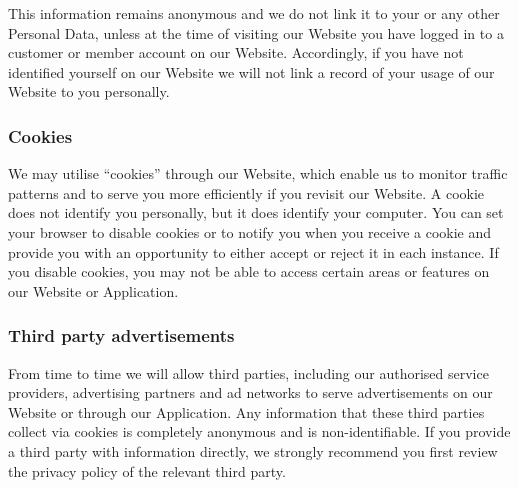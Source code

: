 \documentclass[10pt]{article}
\begin{document}
This information remains anonymous and we do not link it to your or any other Personal Data, unless at the time of visiting our Website you have logged in to a customer or member account on our Website. Accordingly, if you have not identified yourself on our Website we will not link a record of your usage of our Website to you personally.

\subsubsection{Cookies}
We may utilise ``cookies'' through our Website, which enable us to monitor traffic patterns and to serve you more efficiently if you revisit our Website. A cookie does not identify you personally, but it does identify your computer. You can set your browser to disable cookies or to notify you when you receive a cookie and provide you with an opportunity to either accept or reject it in each instance. If you disable cookies, you may not be able to access certain areas or features on our Website or Application.

\subsubsection{Third party advertisements}
From time to time we will allow third parties, including our authorised service providers, advertising partners and ad networks to serve advertisements on our Website or through our Application. Any information that these third parties collect via cookies is completely anonymous and is non-identifiable. If you provide a third party with information directly, we strongly recommend you first review the privacy policy of the relevant third party.
\end{document}
